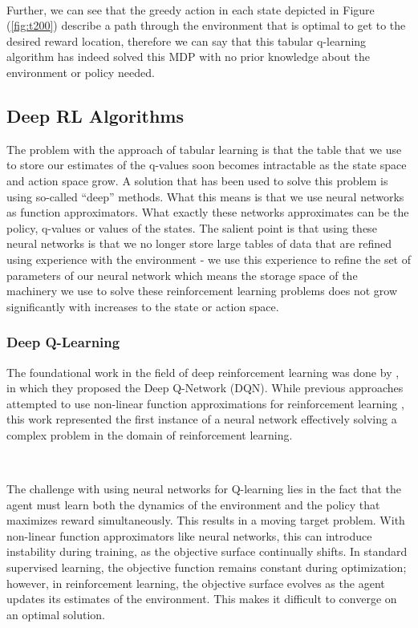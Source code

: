 \documentclass{article}
\begin{document}
\

Further, we can see that the greedy action in each state depicted in Figure (\ref{fig:t200}) describe a path through the environment that is optimal to get to the desired reward location, therefore we can say that this tabular q-learning algorithm has indeed solved this MDP with no prior knowledge about the environment or policy needed.

\subsection{Deep RL Algorithms}\label{sec:deep_rl}

The problem with the approach of tabular learning is that the table that we use to store our estimates of the q-values soon becomes intractable as the state space and action space grow. A solution that has been used to solve this problem is using so-called ``deep'' methods. What this means is that we use neural networks as function approximators. What exactly these networks approximates can be the policy, q-values or values of the states. The salient point is that using these neural networks is that we no longer store large tables of data that are refined using experience with the environment - we use this experience to refine the set of parameters of our neural network which means the storage space of the machinery we use to solve these reinforcement learning problems does not grow significantly with increases to the state or action space.

\subsubsection{Deep Q-Learning}

The foundational work in the field of deep reinforcement learning was done by \citet{mnih2013playing}, in which they proposed the Deep Q-Network (DQN). While previous approaches attempted to use non-linear function approximations for reinforcement learning \citep{tsitsiklis1996temporal}, this work represented the first instance of a neural network effectively solving a complex problem in the domain of reinforcement learning.

\

The challenge with using neural networks for Q-learning lies in the fact that the agent must learn both the dynamics of the environment and the policy that maximizes reward simultaneously. This results in a moving target problem. With non-linear function approximators like neural networks, this can introduce instability during training, as the objective surface continually shifts. In standard supervised learning, the objective function remains constant during optimization; however, in reinforcement learning, the objective surface evolves as the agent updates its estimates of the environment. This makes it difficult to converge on an optimal solution.
\end{document}
